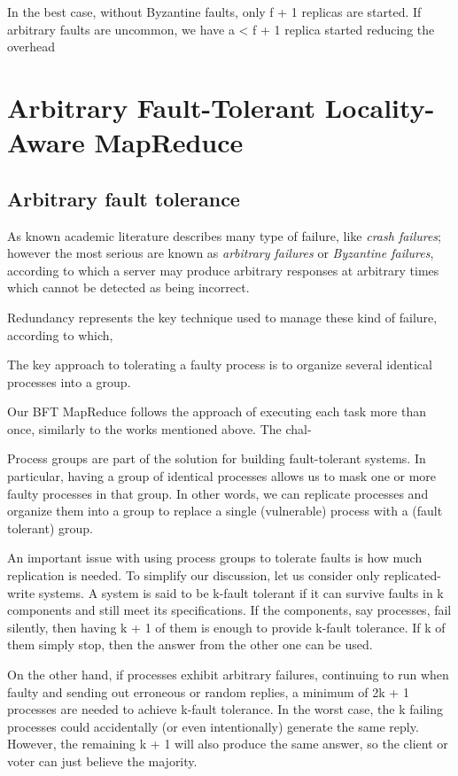 \documentclass[sigchi]{acmart}
\begin{document}
In the best case, without Byzantine faults, only f + 1 replicas are started. If arbitrary faults are uncommon, we have a < f + 1 replica started reducing the overhead 

\section{Arbitrary Fault-Tolerant Locality-Aware MapReduce}

\subsection{Arbitrary fault tolerance}

As known academic literature describes many type of failure, like \textit{crash failures}; however the most serious are known as \textit{arbitrary failures} or \textit{Byzantine failures}, according to which a server may produce arbitrary responses at arbitrary times which cannot be detected as being incorrect. 

Redundancy represents the key technique used to manage these kind of failure, according to which, 


The key approach to tolerating a faulty process is to organize several identical processes into a group. 


 Our BFT
MapReduce follows the approach of executing each task more
than once, similarly to the works mentioned above. The chal-



Process groups are part of the solution for building fault-tolerant systems.
In particular, having a group of identical processes allows us to mask one
or more faulty processes in that group. In other words, we can replicate
processes and organize them into a group to replace a single (vulnerable)
process with a (fault tolerant) group. 

An important issue with using process groups to tolerate faults is how
much replication is needed. To simplify our discussion, let us consider
only replicated-write systems. A system is said to be k-fault tolerant if it
can survive faults in k components and still meet its specifications. If the
components, say processes, fail silently, then having k + 1 of them is enough
to provide k-fault tolerance. If k of them simply stop, then the answer from
the other one can be used.

On the other hand, if processes exhibit arbitrary failures, continuing to
run when faulty and sending out erroneous or random replies, a minimum
of 2k + 1 processes are needed to achieve k-fault tolerance. In the worst case,
the k failing processes could accidentally (or even intentionally) generate the
same reply. However, the remaining k + 1 will also produce the same answer,
so the client or voter can just believe the majority.





\appendix
\end{document}
